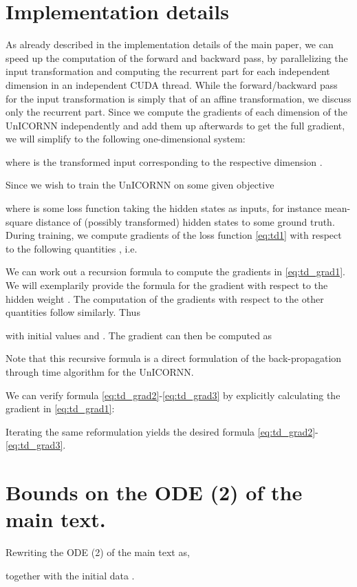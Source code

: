 \documentclass[a4paper]{article}
\begin{document}
\section{Implementation details}
As already described in the implementation details of the main paper, we can speed up the computation of the forward and backward pass, by parallelizing the input transformation and computing the recurrent part for each independent dimension in an independent CUDA thread. While the forward/backward pass for the input transformation is simply that of an affine transformation, we discuss only the recurrent part. Since we compute the gradients of each dimension of the UnICORNN independently and add them up afterwards to get the full gradient, we will simplify to the following one-dimensional system:


where  is the transformed input corresponding to the respective dimension .

Since we wish to train the UnICORNN on some given objective

where  is some loss function taking the hidden states  as inputs, for instance mean-square distance of (possibly transformed) hidden states  to some ground truth. During training, we compute gradients of the loss function \eqref{eq:td1} with respect to the following quantities , i.e.


We can work out a recursion formula to compute the gradients in \eqref{eq:td_grad1}. We will exemplarily provide the formula for the gradient with respect to the hidden weight . The computation of the gradients with respect to the other quantities follow similarly. 
Thus

with initial values  and .
The gradient can then be computed as

Note that this recursive formula is a direct formulation of the back-propagation through time algorithm \citep{bptt} for the UnICORNN. 

We can verify formula \eqref{eq:td_grad2}-\eqref{eq:td_grad3} by explicitly calculating the gradient in \eqref{eq:td_grad1}:


Iterating the same reformulation yields the desired formula \eqref{eq:td_grad2}-\eqref{eq:td_grad3}.
\section{Bounds on the ODE (2) of the main text.}
Rewriting the ODE (2) of the main text as,

together with the initial data .
\end{document}
